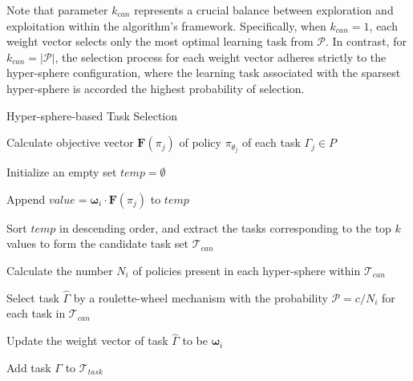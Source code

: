 \documentclass[10pt,journal,compsoc]{IEEEtran}
\begin{document}
\par Note that parameter $k_{can}$ represents a crucial balance between exploration and exploitation within the algorithm's framework. Specifically, when $k_{can}=1$, each weight vector selects only the most optimal learning task from $\mathcal{P}$. In contrast, for $k_{can} = |\mathcal{P}|$, the selection process for each weight vector adheres strictly to the hyper-sphere configuration, where the learning task associated with the sparsest hyper-sphere is accorded the highest probability of selection.


\begin{algorithm} [t]
    \caption{Hyper-sphere-based Task Selection}
    \label{alg:taskSelection}

    Calculate objective vector $\boldsymbol{F} \left( \pi_j \right)$ of policy $\pi_{\theta_j}$ of each task $\Gamma_j \in P$\;

     {

        Initialize an empty set $temp = \emptyset$\;
        
         {
        
            Append $value = \boldsymbol{\omega}_i \cdot \boldsymbol{F} \left( \pi_j \right)$ to $temp$\;

        }

        Sort $temp$ in descending order, and extract the tasks corresponding to the top $k$ values to form the candidate task set $\mathcal{T}_{can}$\;

        Calculate the number $N_i$ of policies present in each hyper-sphere within $\mathcal{T}_{can}$\;

        Select task $\hat{\Gamma}$ by a roulette-wheel mechanism with the probability $\mathcal{P} = c / N_i$ for each task in $\mathcal{T}_{can}$\;

        Update the weight vector of task $\hat{\Gamma}$ to be $\boldsymbol{\omega}_i$\;
        
        Add task $\Gamma$ to $\mathcal{T}_{task}$\;
    }
    
\end{algorithm}
\end{document}
